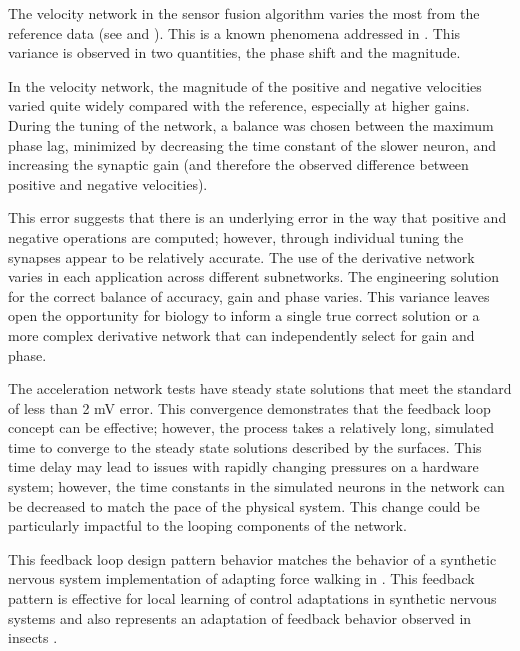 
The velocity network in the sensor fusion algorithm varies the most from the
reference data (see  and ). This is a known phenomena addressed in
\cite{NickFunctionalSubnetwork}. This variance is observed in two quantities,
the phase shift and the magnitude.

In the velocity network, the magnitude of the positive and negative
velocities varied quite widely compared with the reference, especially at
higher gains. During the tuning of the network, a balance was chosen between
the maximum phase lag, minimized by decreasing the time constant of the slower
neuron, and increasing the synaptic gain (and therefore the observed difference between
positive and negative velocities).

This error suggests that there is an underlying error in the way that positive
and negative operations are computed; however, through individual tuning the
synapses appear to be relatively accurate. The use of the derivative network
varies in each application across different subnetworks. The engineering
solution for the correct balance of accuracy, gain and phase varies. This
variance leaves open the opportunity for biology to inform a single true correct
solution or a more complex derivative network that can independently select for
gain and phase.


The acceleration network tests have steady state solutions that meet the standard of less than 2 mV error.
This convergence demonstrates that the feedback loop concept can be effective; however, the process takes a relatively long, simulated time to
converge to the steady state solutions described by the surfaces. This time delay may lead to
issues with rapidly changing pressures on a hardware system; however, the time constants in the simulated neurons in the network can be decreased to match the pace of the physical system. This change could be particularly impactful to the looping components of the network. 

This feedback loop design pattern behavior matches the behavior of a synthetic nervous system implementation of adapting force walking in \cite{LegLocal}. This feedback pattern is effective for local learning of control adaptations in synthetic nervous systems and also represents an adaptation of feedback behavior observed in insects \cite{LegLocal}.


